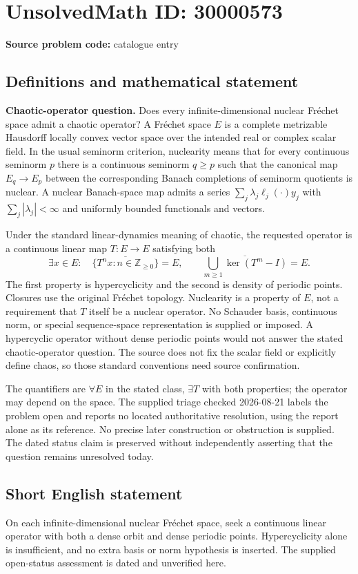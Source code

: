 \documentclass[11pt]{article}
\newcommand{\Z}{\mathbb{Z}}
\begin{document}
\section*{UnsolvedMath ID: 30000573}
\textbf{Source problem code:} catalogue entry
\subsection{Definitions and mathematical statement}
\textbf{Chaotic-operator question.} Does every infinite-dimensional nuclear Fr\'echet space admit a chaotic operator? A Fr\'echet space \(E\) is a complete metrizable Hausdorff locally convex vector space over the intended real or complex scalar field. In the usual seminorm criterion, nuclearity means that for every continuous seminorm \(p\) there is a continuous seminorm \(q\ge p\) such that the canonical map \(E_q\to E_p\) between the corresponding Banach completions of seminorm quotients is nuclear. A nuclear Banach-space map admits a series \(\sum_j\lambda_j\ell_j(\cdot)y_j\) with \(\sum_j|\lambda_j|<\infty\) and uniformly bounded functionals and vectors.\par Under the standard linear-dynamics meaning of chaotic, the requested operator is a continuous linear map \(T:E\to E\) satisfying both\[\exists x\in E:\quad\overline{\{T^nx:n\in\Z_{\ge0}\}}=E,\qquad \overline{\bigcup_{m\ge1}\ker(T^m-I)}=E.\] The first property is hypercyclicity and the second is density of periodic points. Closures use the original Fr\'echet topology. Nuclearity is a property of \(E\), not a requirement that \(T\) itself be a nuclear operator. No Schauder basis, continuous norm, or special sequence-space representation is supplied or imposed. A hypercyclic operator without dense periodic points would not answer the stated chaotic-operator question. The source does not fix the scalar field or explicitly define chaos, so those standard conventions need source confirmation.\par The quantifiers are \(\forall E\) in the stated class, \(\exists T\) with both properties; the operator may depend on the space. The supplied triage checked 2026-08-21 labels the problem open and reports no located authoritative resolution, using the report alone as its reference. No precise later construction or obstruction is supplied. The dated status claim is preserved without independently asserting that the question remains unresolved today.
\subsection{Short English statement}
On each infinite-dimensional nuclear Fr\'echet space, seek a continuous linear operator with both a dense orbit and dense periodic points. Hypercyclicity alone is insufficient, and no extra basis or norm hypothesis is inserted. The supplied open-status assessment is dated and unverified here.
\end{document}
